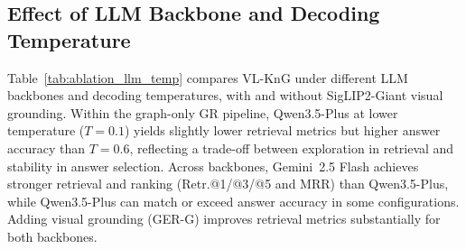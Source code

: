 \subsection{Effect of LLM Backbone and Decoding Temperature}

Table~\ref{tab:ablation_llm_temp} compares VL-KnG under different LLM backbones and decoding temperatures, with and without SigLIP2-Giant visual grounding.
Within the graph-only GR pipeline, Qwen3.5-Plus at lower temperature ($T{=}0.1$) yields slightly lower retrieval metrics but higher answer accuracy than $T{=}0.6$, reflecting a trade-off between exploration in retrieval and stability in answer selection.
Across backbones, Gemini~2.5 Flash achieves stronger retrieval and ranking (Retr.@1/@3/@5 and MRR) than Qwen3.5-Plus, while Qwen3.5-Plus can match or exceed answer accuracy in some configurations.
Adding visual grounding (GER-G) improves retrieval metrics substantially for both backbones.

\begin{table}[ht]
\centering
{}
\caption{Ablation within VL-KnG variants (GR and GER-G): comparing LLM backbones (Gemini~2.5 Flash vs.\ Qwen3.5-Plus), decoding temperature ($T \in \{0.1, 0.6\}$), and the effect of adding SigLIP2-Giant visual grounding. Shorthand: Q3.5P denotes Qwen3.5-Plus; G2.5F denotes Gemini~2.5 Flash. All metrics are reported as percentages (\%).Higher is better ($\uparrow$)}
\scriptsize
\label{tab:ablation_llm_temp}
\end{table}

